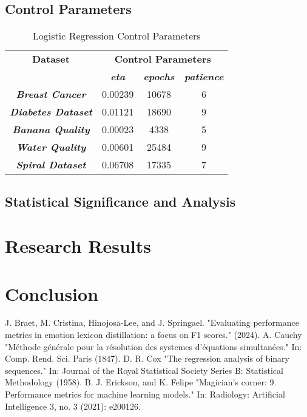 \documentclass[10pt, conference]{IEEEtran}
\begin{document}
\subsection{Control Parameters} \label{section: control_parameters}

\begin{table}[h!]
    \caption{Logistic Regression Control Parameters}
    \begin{center}
        \begin{tabular}{|c||c|c|c|}
            \hline
            \textbf{Dataset}&\multicolumn{3}{|c|}{\textbf{Control Parameters}} \\
            \cline{2-4}
                        & \textbf{\textit{eta}} & \textbf{\textit{epochs}} & \textbf{\textit{patience}}\\
            \hline
            \textbf{\textit{Breast Cancer}} & 0.00239 & 10678 & 6 \\
            \textbf{\textit{Diabetes Dataset}} & 0.01121 & 18690 & 9\\
            \textbf{\textit{Banana Quality}}  & 0.00023 & 4338 & 5 \\
            \textbf{\textit{Water Quality}} & 0.00601 & 25484 & 9 \\
            \textbf{\textit{Spiral Dataset}} & 0.06708 & 17335 & 7\\
            \hline
        \end{tabular}
    \end{center}
    \label{table: LR_control_parameters}
\end{table}

\subsection{Statistical Significance and Analysis}

\section{Research Results} \label{section: Research Results}

\section{Conclusion} \label{section: Conclusion}

\begin{thebibliography}{00}
     J. Braet, M. Cristina, Hinojosa-Lee, and J. Springael. "Evaluating performance metrics in emotion lexicon distillation: a focus on F1 scores." (2024).
     A. Cauchy "Méthode générale pour la résolution des systemes d’équations simultanées." In: Comp. Rend. Sci. Paris (1847).
     D. R. Cox "The regression analysis of binary sequences." In: Journal of the Royal Statistical Society Series B: Statistical Methodology (1958).
     B. J. Erickson, and K. Felipe "Magician’s corner: 9. Performance metrics for machine learning models." In: Radiology: Artificial Intelligence 3, no. 3 (2021): e200126.
\end{thebibliography}

\printglossary[type=\acronymtype]
\end{document}
